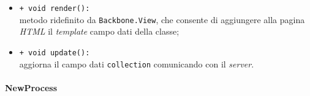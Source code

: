 \begin{flushleft}
\begin{itemize}
\begin{sloppypar}
\begin{itemize}
\item \texttt{+ void render():}\\ metodo ridefinito da \texttt{Backbone.View}, che consente di aggiungere alla pagina \textit{HTML} il \textit{template} campo dati della classe;
\item \texttt{+ void update():}\\ aggiorna il campo dati \texttt{collection} comunicando con il \textit{server}.
\end{itemize}
\end{sloppypar}
\end{itemize}
\end{flushleft}

\paragraph{NewProcess}
\label{newProcess}
